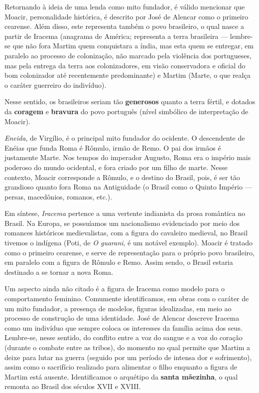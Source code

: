 Retornando à ideia de uma lenda como mito fundador, é válido mencionar que Moacir, personalidade histórica, é descrito por José de Alencar como o primeiro cearense. Além disso, este representa também o povo brasileiro, o qual nasce a partir de Iracema (anagrama de América; representa a terra brasileira — lembre-se que não fora Martim quem conquistara a índia, mas esta quem se entregar, em paralelo ao processo de colonização, não marcado pela violência dos portugueses, mas pela entrega da terra aos colonizadores, em visão conservadora e oficial do bom colonizador até recentemente predominante) e Martim (Marte, o que realça o caráter guerreiro do indivíduo).

Nesse sentido, os brasileiros seriam tão \textbf{generosos} quanto a terra fértil, e dotados da \textbf{coragem} e \textbf{bravura} do povo português (nível simbólico de interpretação de Moacir).

\textit{Eneida}, de Virgílio, é o principal mito fundador do ocidente. O descendente de Enéias que funda Roma é Rômulo, irmão de Remo. O pai dos irmãos é justamente Marte. Nos tempos do imperador Augusto, Roma era o império mais poderoso do mundo ocidental, e fora criado por um filho de marte. Nesse contexto, Moacir corresponde a Rômulo, e o destino do Brasil, pois, é ser tão grandioso quanto fora Roma na Antiguidade (o Brasil como o Quinto Império — persas, macedônios, romanos, etc.).

Em síntese, \textit{Iracema} pertence a uma vertente indianista da prosa romântica no Brasil. Na Europa, se possuíamos um nacionalismo evidenciado por meio dos romances históricos medievalistas, com a figura do cavaleiro medieval, no Brasil tivemos o indígena (Poti, de \textit{O guarani}, é um notável exemplo). Moacir é tratado como o primeiro cearense, e serve de representação para o próprio povo brasileiro, em paralelo com a figura de Rômulo e Remo. Assim sendo, o Brasil estaria destinado a se tornar a nova Roma.

Um aspecto ainda não citado é a figura de Iracema como modelo para o comportamento feminino. Comumente identificamos, em obras com o caráter de um mito fundador, a presença de modelos, figuras idealizadas, em meio ao processo de construção de uma identidade. José de Alencar descreve Iracema como um indivíduo que sempre coloca os interesses da família acima dos seus. Lembre-se, nesse sentido, do conflito entre a voz do sangue e a voz do coração (durante o combate entre as tribos), do momento no qual permite que Martim a deixe para lutar na guerra (seguido por um período de intensa dor e sofrimento), assim como o sacrifício realizado para alimentar o filho enquanto a figura de Martim está ausente. Identificamos o arquétipo da \textbf{santa mãezinha}, o qual remonta ao Brasil dos séculos XVII e XVIII.

